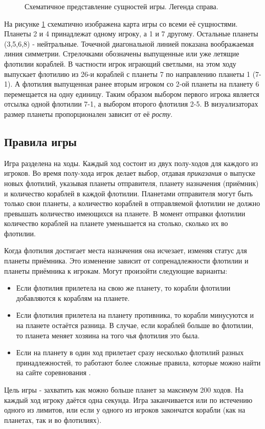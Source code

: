 \documentclass[12pt]{report}
\newenvironment{myItemize}{
	\begin{itemize}
  		\setlength{\itemsep}{1pt}
  		\setlength{\parskip}{0pt}
  		\setlength{\parsep}{0pt}
}{\end{itemize}}
\begin{document}
\begin{figure}[h]
	\centering
	
	\caption{Схематичное представление сущностей игры. Легенда справа.}
	\label{fig:pw_entities}
\end{figure}
На рисунке \ref{fig:pw_entities} схематично изображена карта игры со всеми её сущностями. Планеты 2 и 4 принадлежат одному игроку, а 1 и 7 другому. Остальные планеты (3,5,6,8) - нейтральные. Точечной диагональной линией показана воображаемая линия симметрии. Стрелочками обозначены выпущенные или уже летящие флотилии кораблей. В частности игрок играющий светлыми, на этом ходу выпускает флотилию из 26-и кораблей с планеты 7 по направлению планеты 1 (7-1). А флотилия выпущенная ранее вторым игроком со 2-ой планеты на планету 6 перемещается на одну единицу. Таким образом выбором первого игрока является отсылка одной флотилии 7-1, а выбором второго флотилия 2-5. В визуализаторах размер планеты пропорционален зависит от её \emph{росту}.



\subsection{Правила игры}
\label{sec:game_rules}
Игра разделена на ходы. Каждый ход состоит из двух полу-ходов для каждого из игроков. Во время полу-хода игрок делает выбор, отдавая \emph{приказания} о выпуске новых флотилий, указывая планеты отправителя, планету назначения (приёмник) и количество кораблей в каждой флотилии. Планетами отправителя могут быть только свои планеты, а количество кораблей в отправляемой флотилии не должно превышать количество имеющихся на планете. В момент отправки флотилии количество кораблей на планете уменьшается на столько, сколько их во флотилии.

Когда флотилия достигает места назначения она исчезает, изменяя статус для планеты приёмника. Это изменение зависит от сопренадлежности флотилии и планеты приёмника к игрокам. Могут произойти следующие варианты:
\begin{myItemize}
\item Если флотилия прилетела на свою же планету, то корабли флотилии добавляются к кораблям на планете.
\item Если флотилия прилетела на планету противника, то корабли минусуются и на планете остаётся разница. В случае, если кораблей больше во флотилии, то планета меняет хозяина на того чья флотилия это была.
\item Если на планету в один ход прилетает сразу несколько флотилий разных принадлежностей, то работают более сложные правила, которые можно найти на сайте соревнования \citep{PlanetWarsSpec}.
\end{myItemize}
Цель игры - захватить как можно больше планет за максимум 200 ходов. На каждый ход игроку даётся одна секунда. Игра заканчивается или по истечению одного из лимитов, или если у одного из игроков закончатся корабли (как на планетах, так и во флотилиях). \citep{PlanetWarsSpec}
\end{document}
